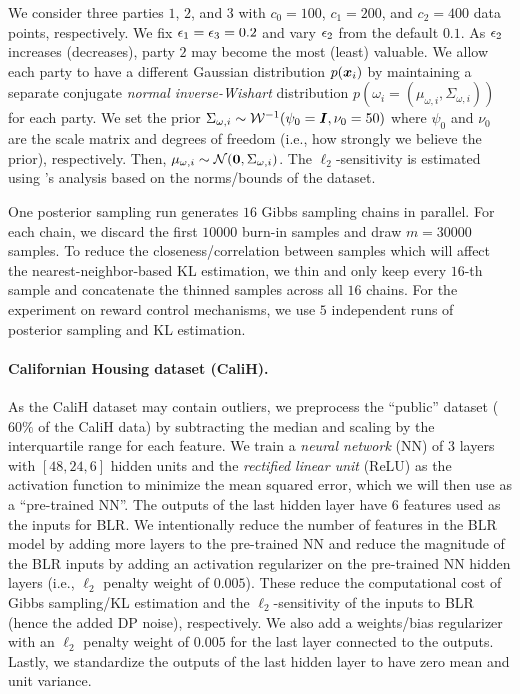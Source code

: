 \documentclass{article}
\theoremstyle{plain}
\theoremstyle{definition}
\theoremstyle{remark}
\renewcommand{\citet}[1]{\cite{#1}}
\begin{document}
We consider three parties $1$, $2$, and $3$ with $c_0=100$, $c_1=200$, and $c_2=400$ data points, respectively. We fix ${\epsilon}_1 = {\epsilon}_3 = 0.2$ and vary ${\epsilon}_2$ from the default $0.1$. As ${\epsilon}_2$ increases (decreases), party $2$ may become the most (least) valuable. We allow each party to have a different Gaussian distribution $p({\bm{x}}_i)$ by maintaining a separate conjugate \emph{normal inverse-Wishart} distribution $p(\omega_i = (\mu_{\omega,i},\Sigma_{\omega,i}))$ for each party. We set the prior $\Sigma_{\omega,i} \sim {\mathcal{W}}^{-1}(\psi_0={\bm{I}}, \nu_0=50)$ where $\psi_0$ and $\nu_0$ are the scale matrix and degrees of freedom (i.e., how strongly we believe the prior), respectively. Then, $\mu_{\omega,i} \sim \mathcal{N}({\bm{0}}, \Sigma_{\omega,i} )$.
The $\ell_2$-sensitivity is estimated using \citet{kulkarni2021locally}'s analysis based on the norms/bounds of the dataset.

One posterior sampling run generates $16$ Gibbs sampling chains in parallel. For each chain, we discard the first $10000$ burn-in samples and draw $m=30000$ samples. To reduce the closeness/correlation between samples which will affect the nearest-neighbor-based KL estimation, we thin and only keep every $16$-th sample and concatenate the thinned samples across all $16$ chains.
For the experiment on reward control mechanisms, we use $5$ independent runs of posterior sampling and KL estimation.

\paragraph{Californian Housing dataset (CaliH).} 
As the CaliH dataset may contain outliers, we preprocess the ``public'' dataset ($60\%$ of the CaliH data) by subtracting the median and scaling by the interquartile range for each feature. We train a \emph{neural network} (NN) of $3$ layers with $[48, 24, 6]$ hidden units and the \emph{rectified linear unit} (ReLU) as the activation function to minimize the mean squared error, which we will then use as a ``pre-trained NN''. 
The outputs of the last hidden layer have $6$ features used as the inputs for BLR.
We intentionally reduce the number of features in the BLR model by adding more layers to the pre-trained NN and reduce the magnitude of the BLR inputs by adding an activation regularizer on the pre-trained NN hidden layers (i.e., $\ell_2$ penalty weight of $0.005$). These reduce the computational cost of Gibbs sampling/KL estimation and the $\ell_2$-sensitivity of the inputs to BLR (hence the added DP noise), respectively. We also add a weights/bias regularizer with an $\ell_2$ penalty weight of $0.005$ for the last layer connected to the outputs.
Lastly, we standardize the outputs of the last hidden layer to have zero mean and unit variance.
\end{document}
